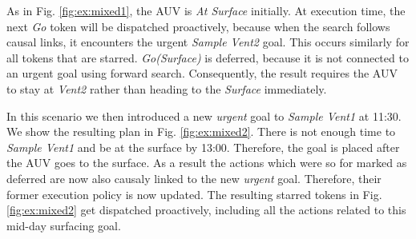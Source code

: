 As in Fig. \ref{fig:ex:mixed1}, the AUV is {\em At Surface} initially.
At execution time, the next {\em Go} token will be dispatched
proactively, because when the search follows causal links, it
encounters the urgent {\em Sample Vent2} goal.  This occurs similarly
for all tokens that are starred. {\em Go(Surface)} is deferred,
because it is not connected to an urgent goal using forward
search. Consequently, the result requires the AUV to stay at {\em
  Vent2} rather than heading to the {\em Surface} immediately.


In this scenario we then introduced a new {\em urgent} goal to {\em
  Sample Vent1} at 11:30. We show the resulting plan in
Fig. \ref{fig:ex:mixed2}. There is not enough time to {\em Sample
  Vent1} and be at the surface by 13:00. Therefore, the goal is placed
after the AUV goes to the surface. As a result the actions which were
so for marked as deferred are now also causaly linked to the new
{\em urgent} goal. Therefore, their former execution policy is now
updated. The resulting starred tokens in Fig. \ref{fig:ex:mixed2} get
dispatched proactively, including all the actions related to this
mid-day surfacing goal.

